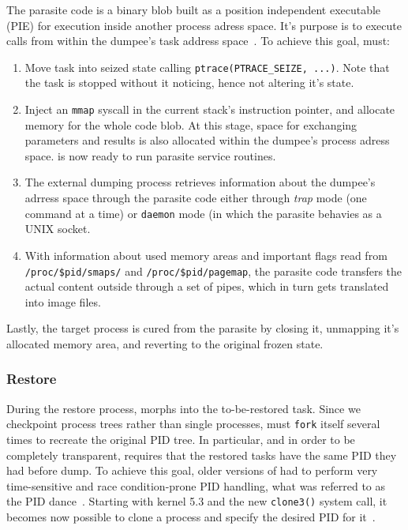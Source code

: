The parasite code is a binary blob built as a position independent executable (PIE) for execution inside another process adress space.
It's purpose is to execute \criu calls from within the dumpee's task address space~\cite{criu-parasite-code}.
To achieve this goal, \criu must:
\begin{enumerate}
    \item Move task into seized state calling \texttt{ptrace(PTRACE\_SEIZE, ...)}. Note that the task is stopped without it noticing, hence not altering it's state.
    \item Inject an \texttt{mmap} syscall in the current stack's instruction pointer, and allocate memory for the whole code blob. At this stage, space for exchanging parameters and results is also allocated within the dumpee's process adress space. \criu is now ready to run parasite service routines.
    \item The external dumping process retrieves information about the dumpee's adrress space through the parasite code either through \emph{trap} mode (one command at a time) or \texttt{daemon} mode (in which the parasite behavies as a UNIX socket.
    \item With information about used memory areas and important flags read from \texttt{/proc/\$pid/smaps/} and \texttt{/proc/\$pid/pagemap}, the parasite code transfers the actual content outside through a set of pipes, which in turn gets translated into image files.
\end{enumerate}
Lastly, the target process is cured from the parasite by closing it, unmapping it's allocated memory area, and reverting to the original frozen state.

\subsubsection*{Restore}

During the restore process, \criu morphs into the to-be-restored task.
Since we checkpoint process trees rather than single processes, \criu must \texttt{fork} itself several times to recreate the original PID tree.
In particular, and in order to be completely transparent, \criu requires that the restored tasks have the same PID they had before dump.
To achieve this goal, older versions of \criu had to perform very time-sensitive and race condition-prone PID handling, what was referred to as the PID dance~\cite{Reber2019,criu-pid-dance}.
Starting with kernel 5.3 and the new \texttt{clone3()} system call, it becomes now possible to clone a process and specify the desired PID for it~\cite{kernel-clone3}.

